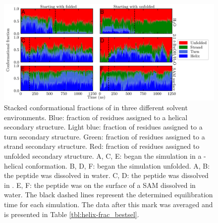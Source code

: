 \begin{figure}
    \center
    \includegraphics[width=\double]{figures-helix/combined_helicity.png}
    \caption[Stacked conformational fractions of \pep{} in three different solvent environments]{
        Stacked conformational fractions of \pep{} in three different solvent environments. 
        Blue: fraction of residues assigned to a helical secondary structure. 
        Light blue: fraction of residues assigned to a turn secondary structure. 
        Green: fraction of residues assigned to a strand secondary structure. 
        Red: fraction of residues assigned to unfolded secondary structure. 
        A, C, E: \pep{} began the simulation in a \textalpha{}-helical conformation. 
        B, D, F: \pep{} began the simulation unfolded. 
        A, B: the peptide was dissolved in water. 
        C, D: the peptide was dissolved in \tbawat{}. 
        E, F: the peptide was on the surface of a SAM dissolved in water. 
        The black dashed lines represent the determined equilibration time for each simulation. 
        The data after this mark was averaged and is presented in Table \ref{tbl:helix-frac_bestsel}.
    }
    \label{fig:helix-conf_fracs}
\end{figure}

